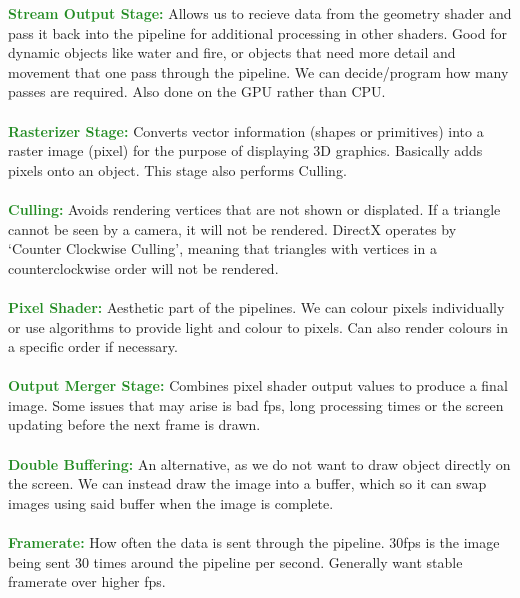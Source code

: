 \documentclass[a4paper,10pt]{article}
\begin{document}
\noindent \textcolor{ForestGreen}{\textbf{Stream Output Stage:}} Allows us to recieve data from the geometry shader and pass it back into the pipeline for additional processing in other shaders. Good for dynamic objects like water and fire, or objects that need more detail and movement that one pass through the pipeline. We can decide/program how many passes are required. Also done on the GPU rather than CPU.\\\\
\noindent \textcolor{ForestGreen}{\textbf{Rasterizer Stage:}} Converts vector information (shapes or primitives) into a raster image (pixel) for the purpose of displaying 3D graphics. Basically adds pixels onto an object. This stage also performs Culling.\\\\
\noindent \textcolor{ForestGreen}{\textbf{Culling:}} Avoids rendering vertices that are not shown or displated. If a triangle cannot be seen by a camera, it will not be rendered. DirectX operates by `Counter Clockwise Culling', meaning that triangles with vertices in a counterclockwise order will not be rendered. \\\\
\noindent \textcolor{ForestGreen}{\textbf{Pixel Shader:}} Aesthetic part of the pipelines. We can colour pixels individually or use algorithms to provide light and colour to pixels. Can also render colours in a specific order if necessary.  \\\\
\noindent \textcolor{ForestGreen}{\textbf{Output Merger Stage:}} Combines pixel shader output values to produce a final image. Some issues that may arise is bad fps, long processing times or the screen updating before the next frame is drawn. \\\\
\noindent \textcolor{ForestGreen}{\textbf{Double Buffering:}} An alternative, as we do not want to draw object directly on the screen. We can instead draw the image into a buffer, which so it can swap images using said buffer when the image is complete. \\\\
\noindent \textcolor{ForestGreen}{\textbf{Framerate:}} How often the data is sent through the pipeline. 30fps is the image being sent 30 times around the pipeline per second. Generally want stable framerate over higher fps. \\\\

\newpage
\end{document}
